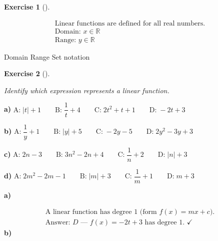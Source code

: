 \documentclass[
  letterpaper,
  DIV=11,
  numbers=noendperiod]{scrreprt}
\theoremstyle{definition}
\newtheorem{exercise}{Exercise}[chapter]
\theoremstyle{remark}
\begin{document}
\begin{exercise}[]
\begin{tcolorbox}
\[
\begin{aligned}
\text{Linear functions are defined for all real numbers.} \\[4pt] \text{Domain: } x \in \mathbb{R} \\[4pt] \text{Range: } y \in \mathbb{R}
\end{aligned}
\]

\end{tcolorbox}

{Domain} {Range} {Set notation}

\end{exercise}

\begin{exercise}[]\protect\hypertarget{exr-u7-7}{}\label{exr-u7-7}

\emph{Identify which expression represents a linear function.}

\textbf{a)}
\(\displaystyle \text{A:}\; |t| + 1 \qquad \text{B:}\; \dfrac{1}{t} + 4 \qquad \text{C:}\; 2t^2 + t + 1 \qquad \text{D:}\; -2t + 3\)

\textbf{b)}
\(\displaystyle \text{A:}\; \dfrac{1}{y} + 1 \qquad \text{B:}\; |y| + 5 \qquad \text{C:}\; -2y - 5 \qquad \text{D:}\; 2y^2 - 3y + 3\)

\textbf{c)}
\(\displaystyle \text{A:}\; 2n - 3 \qquad \text{B:}\; 3n^2 - 2n + 4 \qquad \text{C:}\; \dfrac{1}{n} + 2 \qquad \text{D:}\; |n| + 3\)

\textbf{d)}
\(\displaystyle \text{A:}\; 2m^2 - 2m - 1 \qquad \text{B:}\; |m| + 3 \qquad \text{C:}\; \dfrac{1}{m} + 1 \qquad \text{D:}\; m + 3\)

\begin{tcolorbox}[enhanced jigsaw, opacitybacktitle=0.6, coltitle=black, arc=.35mm, colframe=quarto-callout-tip-color-frame, colback=white, bottomrule=.15mm, left=2mm, colbacktitle=quarto-callout-tip-color!10!white, titlerule=0mm, opacityback=0, title=\textcolor{quarto-callout-tip-color}{\faLightbulb}\hspace{0.5em}{🔍 View Solutions}, leftrule=.75mm, breakable, rightrule=.15mm, bottomtitle=1mm, toptitle=1mm, toprule=.15mm]

\textbf{a)}

\[
\begin{aligned}
\text{A linear function has degree 1 (form } f(x) = mx + c\text{).} \\[4pt] \text{Answer: } D \text{ — } f(x) = -2t + 3 \text{ has degree 1. }\checkmark
\end{aligned}
\] \textbf{b)}


\end{tcolorbox}
\end{exercise}
\end{document}
